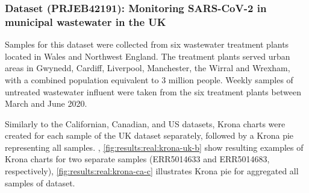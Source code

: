     \subsubsection{Dataset (PRJEB42191): Monitoring SARS-CoV-2 in municipal wastewater in the UK} \label{sec:results:real:uk}
    Samples for this dataset were collected from six wastewater treatment plants located in Wales and Northwest England. The treatment plants served urban areas in Gwynedd, Cardiff, Liverpool, Manchester, the Wirral and Wrexham, with a combined population equivalent to 3 million people. Weekly samples of untreated wastewater influent were taken from the six treatment plants between March and June 2020.
    
    Similarly to the Californian, Canadian, and US datasets, Krona charts were created for each sample of the UK dataset separately, followed by a Krona pie representing all samples. , \ref{fig:results:real:krona-uk-b} show resulting examples of Krona charts for two separate samples (ERR5014633 and ERR5014683, respectively), \cref{fig:results:real:krona-ca-c} illustrates Krona pie for aggregated all samples of dataset.
    
